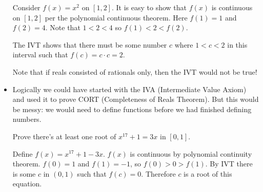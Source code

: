 \begin{itemize}
\begin{example}
        Consider $f(x)=x^2$ on $[1,2]$. It is easy to show that $f(x)$ is continuous on $[1,2]$ per the polynomial continuous theorem. Here $f(1)=1$ and $f(2)=4$. Note that $1<2<4$ so $f(1)<2<f(2)$.
        \vspace{2mm}
        
        The IVT shows that there must be some number $c$ where $1<c<2$ in this interval such that $f(c)=c\cdot c=2$. 
    \end{example}
    Note that if reals consisted of rationals only, then the IVT would not be true!
    \item Logically we could have started with the IVA (Intermediate Value Axiom) and used it to prove CORT (Completeness of Reals Theorem). But this would be messy: we would need to define functions before we had finished defining numbers.
    \begin{example}
        Prove there's at least one root of $x^{17}+1=3x$ in $[0,1]$.
        \vspace{2mm}

        Define $f(x)=x^{17}+1-3x$. $f(x)$ is continuous by polynomial continuity theorem. $f(0)=1$ and $f(1)=-1$, so $f(0)>0>f(1)$. By IVT there is some $c$ in $(0,1)$ such that $f(c)=0$. Therefore $c$ is a root of this equation.
    \end{example}
\end{itemize}